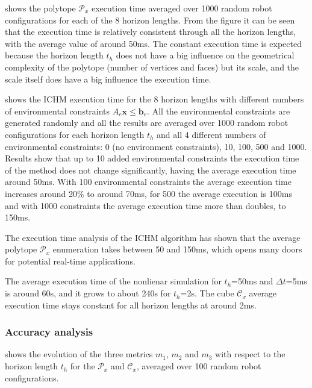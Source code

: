  shows the polytope $\mathcal{P}_x$ execution time averaged over 1000 random robot configurations for each of the 8 horizon lengths. From the figure it can be seen that the execution time is relatively consistent through all the horizon lengths, with the average value of around 50ms. The constant execution time is expected because the horizon length $t_h$ does not have a big influence on the geometrical complexity of the polytope (number of vertices and faces) but its scale, and the scale itself does have a big influence the execution time.


 shows the ICHM execution time for the 8 horizon lengths with different numbers of environmental constraints $A_e\bm{x}\!\leq\!\bm{b}_e$. All the environmental constraints are generated randomly and all the results are averaged over 1000 random robot configurations for each horizon length $t_h$ and all 4 different numbers of environmental constraints: 0 (no environment constraints), 10, 100, 500 and 1000. Results show that up to 10 added environmental constraints the execution time of the method does not change significantly, having the average execution time around 50ms. With 100 environmental constraints the average execution time increases around 20\% to around 70ms, for 500 the average execution is 100ms and with 1000 constraints the average execution time more than doubles, to 150ms.   


The execution time analysis of the ICHM algorithm has shown that the average polytope $\mathcal{P}_x$ enumeration takes between 50 and 150ms, which opens many doors for potential real-time applications.

The average execution time of the nonlienar simulation for $t_h$=50ms and $\Delta t$=5ms is around 60s, and it grows to about 240s for $t_h$=2s. The cube $\mathcal{C}_x$ average execution time stays constant for all horizon lengths at around 2ms.


\subsubsection*{Accuracy analysis}

 shows the evolution of the three metrics $m_1$, $m_2$ and $m_3$ with respect to the horizon length $t_h$ for the $\mathcal{P}_x$ and $\mathcal{C}_x$, averaged over 100 random robot configurations. 

